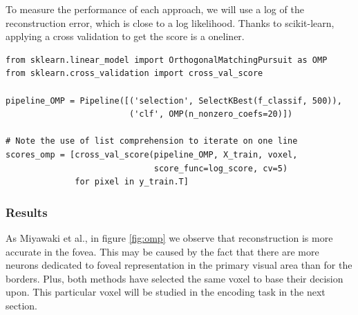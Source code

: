 \documentclass{frontiersSCNS} %
\newcounter{x}
\newcounter{y}
\newcounter{z}
\begin{document}
To measure the performance of each approach, we will use a log of the
reconstruction error, which is close to a log likelihood. Thanks to
scikit-learn, applying a cross validation to get the score is a oneliner.

\begin{lstlisting}
from sklearn.linear_model import OrthogonalMatchingPursuit as OMP
from sklearn.cross_validation import cross_val_score

pipeline_OMP = Pipeline([('selection', SelectKBest(f_classif, 500)),
                         ('clf', OMP(n_nonzero_coefs=20)])

# Note the use of list comprehension to iterate on one line
scores_omp = [cross_val_score(pipeline_OMP, X_train, voxel,
                              score_func=log_score, cv=5)
              for pixel in y_train.T]
\end{lstlisting}

\subsubsection{Results}

As Miyawaki et al., in figure \ref{fig:omp} we observe that reconstruction
is more accurate in the fovea. This
may be caused by the fact that there are more neurons dedicated to foveal
representation in the primary visual area than for the borders.
Plus, both methods have selected the same voxel to base their decision upon.
This particular voxel will be studied in the encoding task in the next section.
\end{document}

